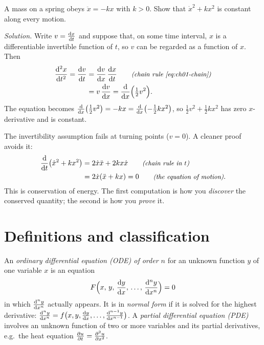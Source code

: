 \begin{example}\label{ex:ch01-v-dvdx}
A mass on a spring obeys $\ddot{x} = -kx$ with $k>0$. Show that
$\dot{x}^2 + kx^2$ is constant along every motion.

\emph{Solution.}  Write
$v = \frac{\mathrm{d}x}{\mathrm{d}t}$ and suppose that, on some time interval, $x$ is a
differentiable invertible function of $t$, so $v$ can be regarded as a
function of $x$. Then
\begin{align*}
  \frac{\mathrm{d}^{2}x}{\mathrm{d}t^{2}} = \frac{\mathrm{d}v}{\mathrm{d}t} &= \frac{\mathrm{d}v}{\mathrm{d}x}\,\frac{\mathrm{d}x}{\mathrm{d}t}
     \qquad\text{\small\itshape(chain rule \eqref{eq:ch01-chain})}\\
  &= v\,\frac{\mathrm{d}v}{\mathrm{d}x} = \frac{\mathrm{d}}{\mathrm{d}x}\Bigl(\tfrac12 v^2\Bigr).
\end{align*}
The equation becomes $\frac{\mathrm{d}}{\mathrm{d}x}\bigl(\tfrac12 v^2\bigr) = -kx = \frac{\mathrm{d}}{\mathrm{d}x}\bigl(-\tfrac12 kx^2\bigr)$,
so $\tfrac12 v^2 + \tfrac12 kx^2$ has zero $x$-derivative and is constant.

The invertibility assumption fails at turning points ($v = 0$). A cleaner
proof avoids it: 
\begin{align*}
  \frac{\mathrm{d}}{\mathrm{d}t}\bigl(\dot{x}^2 + kx^2\bigr)
  &= 2\dot{x}\ddot{x} + 2kx\dot{x} \qquad\text{\small\itshape(chain rule in $t$)}\\
  &= 2\dot{x}(\ddot{x} + kx) = 0 \qquad\text{\small\itshape(the equation of motion)}.
\end{align*}
This is conservation of energy. The first computation is how you
\emph{discover} the conserved quantity; the second is how you \emph{prove} it.
\end{example}

\section{Definitions and classification}\label{sec:ch01-defs}

\begin{definition}\label{def:ch01-ode}
An \emph{ordinary differential equation (ODE) of order $n$} for an unknown
function $y$ of one variable $x$ is an equation
\begin{equation}\label{eq:ch01-general-ode}
  F\Bigl(x,\, y,\, \frac{\mathrm{d}y}{\mathrm{d}x},\, \dots,\, \frac{\mathrm{d}^{n}y}{\mathrm{d}x^{n}}\Bigr) = 0
\end{equation}
in which $\frac{\mathrm{d}^{n}y}{\mathrm{d}x^{n}}$ actually appears. It is in \emph{normal form} if it
is solved for the highest derivative:
$\frac{\mathrm{d}^{n}y}{\mathrm{d}x^{n}} = f\bigl(x, y, \frac{\mathrm{d}y}{\mathrm{d}x}, \dots, \frac{\mathrm{d}^{n-1}y}{\mathrm{d}x^{n-1}}\bigr)$.
A \emph{partial differential equation (PDE)} involves an unknown function of
two or more variables and its partial derivatives, e.g.\ the heat equation
$\frac{\partial u}{\partial t} = \frac{\partial^{2} u}{\partial x^{2}}$.
\end{definition}


